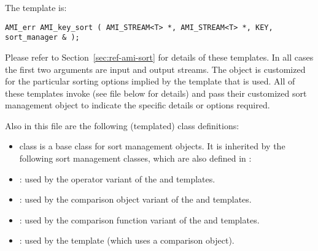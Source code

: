 The  template is:
\begin{verbatim}
AMI_err AMI_key_sort ( AMI_STREAM<T> *, AMI_STREAM<T> *, KEY, sort_manager & );
\end{verbatim}

Please refer to Section~\ref{sec:ref-ami-sort} for details
of these templates.
In all cases the first two arguments are input and output
streams. The  object is customized for
the particular sorting options implied by the template that
is used. All of these templates invoke
 (see file
 below for details) and pass their
customized sort management object to indicate the specific
details or options required.

   Also in this file are the following (templated) class definitions:

    \begin{itemize}
        
        \item class  is a base class for
        sort management objects. It is inherited by the
        following sort management classes, which are also
        defined in :

        \item {}: used by the operator
        variant of the  and  templates.
        
        \item {}: used by the
        comparison object variant of the 
        and  templates.
        
        \item {}: used by the
        comparison function variant of the  and
         templates.

%
        
        \item {}: used by the
         template (which uses a
        comparison object).
    \end{itemize}

